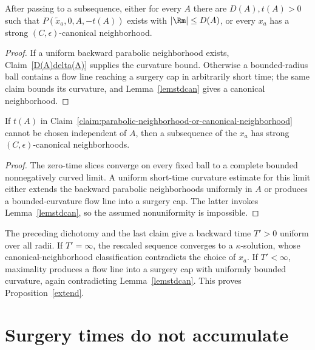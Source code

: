 \begin{claim}
\label{claim:parabolic-neighborhood-or-canonical-neighborhood}
After passing to a subsequence, either for every $A$ there are $D(A),t(A)>0$
such that $P(\widetilde x_a,0,A,-t(A))$ exists with $|\Rm|\leq D(A)$, or every
$x_a$ has a strong $(C,\epsilon)$-canonical neighborhood.
\end{claim}

\begin{proof}
\sketch
{}
If a uniform backward parabolic neighborhood exists, Claim~\ref{D(A)delta(A)}
supplies the curvature bound. Otherwise a bounded-radius ball contains a flow
line reaching a surgery cap in arbitrarily short time; the same claim bounds its
curvature, and Lemma~\ref{lemstdcan} gives a canonical neighborhood.
\end{proof}

\begin{claim}
\label{claim:uniform-t-prime-independent-of-A}
If $t(A)$ in Claim~\ref{claim:parabolic-neighborhood-or-canonical-neighborhood}
cannot be chosen independent of $A$, then a subsequence of the $x_a$ has
strong $(C,\epsilon)$-canonical neighborhoods.
\end{claim}

\begin{proof}
\sketch
{}
The zero-time slices converge on every fixed ball to a complete bounded
nonnegatively curved limit. A uniform short-time curvature estimate for this
limit either extends the backward parabolic neighborhoods uniformly in $A$ or
produces a bounded-curvature flow line into a surgery cap. The latter invokes
Lemma~\ref{lemstdcan}, so the assumed nonuniformity is impossible.
\end{proof}

The preceding dichotomy and the last claim give a backward time $T'>0$ uniform
over all radii. If $T'=\infty$, the rescaled sequence converges to a
$\kappa$-solution, whose canonical-neighborhood classification contradicts the
choice of $x_a$. If $T'<\infty$, maximality produces a flow line into a surgery
cap with uniformly bounded curvature, again contradicting
Lemma~\ref{lemstdcan}. This proves Proposition~\ref{extend}.

\section{Surgery times do not accumulate}
\label{sectcomplete}

